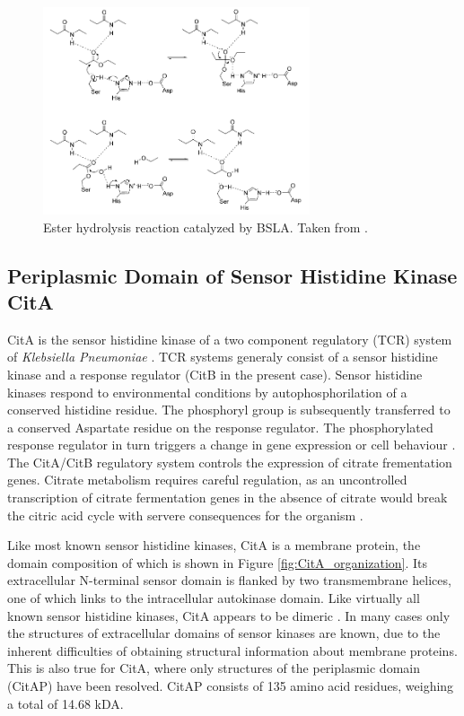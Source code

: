 \documentclass[english, a4paper, 12pt, titlepage, draft]{article}
\begin{document}
\begin{figure}
    \centering
    \includegraphics[width=0.7\textwidth]{figures/BSLA_reaction.png}
    \caption{Ester hydrolysis reaction catalyzed by BSLA. Taken from \cite{BSLA_reaction}.}
    \label{fig:BSLAreaction}
\end{figure}  






\subsection{Periplasmic Domain of Sensor Histidine Kinase CitA}

CitA is the sensor histidine kinase of a two component regulatory (TCR) system of \textit{Klebsiella Pneumoniae} \cite{CitA_original}.
TCR systems generaly consist of a sensor histidine kinase and a response regulator (CitB in the present case).
Sensor histidine kinases respond to environmental conditions by autophosphorilation of a conserved histidine residue.
The phosphoryl group is subsequently transferred to a conserved Aspartate residue on the response regulator.
The phosphorylated response regulator in turn triggers a change in gene expression or cell behaviour \cite{CitA_original}.
The CitA/CitB regulatory system controls the expression of citrate frementation genes.
Citrate metabolism requires careful regulation, as an uncontrolled transcription of citrate fermentation genes in the absence of citrate would break the citric acid cycle with servere consequences for the organism \cite{CitA_original}.

Like most known sensor histidine kinases, CitA is a membrane protein, the domain composition of which is shown in Figure \ref{fig:CitA_organization}.
Its extracellular N-terminal sensor domain is flanked by two transmembrane helices, one of which links to the intracellular autokinase domain.
Like virtually all known sensor histidine kinases, CitA appears to be dimeric \cite{2CST}.
In many cases only the structures of extracellular domains of sensor kinases are known, due to the inherent difficulties of obtaining structural information about membrane proteins.
This is also true for CitA, where only structures of the periplasmic domain (CitAP) have been resolved.
CitAP consists of 135 amino acid residues, weighing a total of 14.68 kDA.
\end{document}

